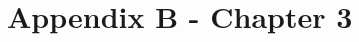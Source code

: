 \documentclass[a4paper,12pt,custommargin,times,numbered,print,index]{PhDThesisPSnPDF}
\begin{document}
\chapter*{\LARGE Appendix B - Chapter 3}
\label{appendix:chapter3}





\begin{spacing}{0.9}


%
\cleardoublepage





\end{spacing}


\printthesisindex %
\end{document}
